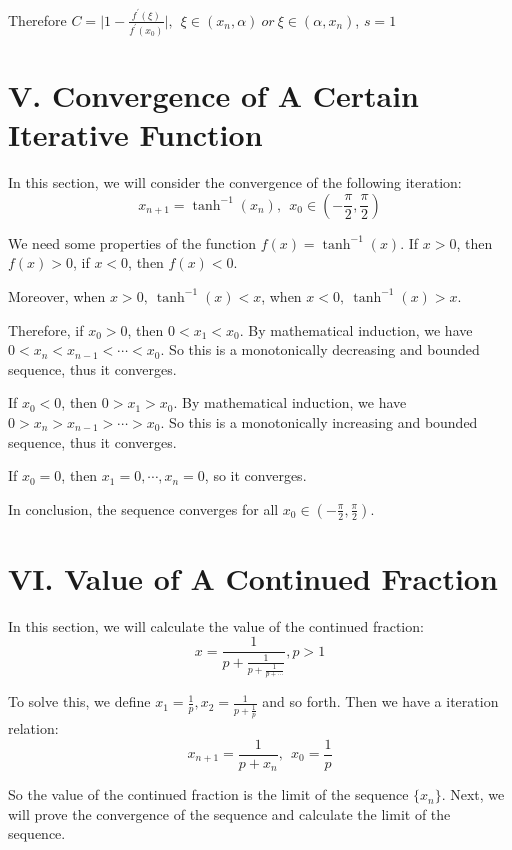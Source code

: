 \documentclass[a4paper]{article}
\begin{document}
Therefore $C = \vert 1-\frac{f^\prime(\xi)}{f^\prime(x_0)} \vert, ~~\xi \in (x_n, \alpha) ~or~ \xi \in (\alpha, x_n)$, $s = 1$

\section*{V. Convergence of A Certain Iterative Function}

In this section, we will consider the convergence of the following iteration:
\begin{equation}
  x_{n+1} = \tanh^{-1} (x_n), ~~x_0 \in (-\frac{\pi}{2}, \frac{\pi}{2}) 
\end{equation}

We need some properties of the function $f(x) = \tanh^{-1}(x)$. If $x>0$, then $f(x) > 0$, if $x<0$, then $f(x) < 0$. 

Moreover, when $x>0,~\tanh^{-1}(x) < x$, when $x<0,~\tanh^{-1}(x) > x$.

Therefore, if $x_0 > 0$, then $0< x_1 < x_0$. By mathematical induction, we have $0 < x_n < x_{n-1} < \cdots < x_0$. So this is a monotonically decreasing and bounded sequence, thus it converges.

If $x_0 < 0$, then $0 > x_1 > x_0$. By mathematical induction, we have $0 > x_n > x_{n-1} > \cdots > x_0$. So this is a monotonically increasing and bounded sequence, thus it converges.

If $x_0 = 0$, then $x_1 = 0, \cdots, x_n = 0$, so it converges.

In conclusion, the sequence converges for all $x_0 \in (-\frac{\pi}{2}, \frac{\pi}{2})$.

\section*{VI. Value of A Continued Fraction}

In this section, we will calculate the value of the continued fraction:
\begin{equation}
  x = \frac{1}{p + \frac{1}{p + \frac{1}{p + \cdots}}}, p>1
\end{equation}

To solve this, we define $x_1 = \frac{1}{p}, x_2 = \frac{1}{p+\frac{1}{p}}$ and so forth. Then we have a iteration relation:
\begin{equation}
  x_{n+1} = \frac{1}{p + x_n}, ~~x_0 = \frac{1}{p}
\end{equation}

So the value of the continued fraction is the limit of the sequence $\{x_n\}$. Next, we will prove the convergence of the sequence and calculate the limit of the sequence.
\end{document}
